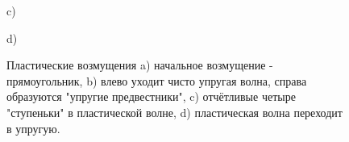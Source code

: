 \begin{figure}
\begin{minipage}[h]{0.47\linewidth}
\end{minipage}
\vfill
\begin{minipage}[h]{0.47\linewidth}
 c) \\
\end{minipage}
\hfill
\begin{minipage}[h]{0.47\linewidth}
 d) \\
\end{minipage}
\caption{Пластические возмущения a) начальное возмущение - прямоугольник, b) влево уходит чисто упругая волна, справа образуются "упругие предвестники", c) отчётливые четыре "ступеньки" в пластической волне, d) пластическая волна переходит в упругую.}
\label{pic:plastic-1d}
\end{figure}

